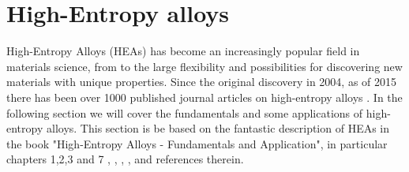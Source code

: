 \chapter{High-Entropy alloys}
\label{sec:HEA}

High-Entropy Alloys (HEAs) has become an increasingly popular field in materials science, from to the large flexibility and possibilities for discovering new materials with unique properties. Since the original discovery in 2004, as of 2015 there has been over 1000 published journal articles on high-entropy alloys \cite{hea2016_ch1}. In the following section we will cover the fundamentals and some applications of high-entropy alloys. This section is be based on the fantastic description of HEAs in the book "High-Entropy Alloys - Fundamentals and Application", in particular chapters 1,2,3 and 7 \cite{hea2016_ch1}, \cite{hea2016_ch2}, \cite{hea2016_ch3}, \cite{hea2016_ch7}, and references therein.

